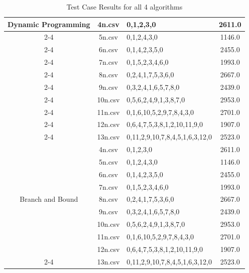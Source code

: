 \documentclass[11pt, a4paper]{article}
\begin{document}
\begin{table}[htbp]
{\begin{tabular}{|c|c|l|c|}
\multirow{9}{*}{Dynamic Programming} 
& 4n.csv & 0,1,2,3,0 & 2611.0 \\ \cline{2-4}
& 5n.csv & 0,1,2,4,3,0 & 1146.0 \\ \cline{2-4}
& 6n.csv &0,1,4,2,3,5,0 & 2455.0 \\ \cline{2-4}
& 7n.csv &0,1,5,2,3,4,6,0 & 1993.0  \\ \cline{2-4}
& 8n.csv & 0,2,4,1,7,5,3,6,0 & 2667.0 \\ \cline{2-4}
& 9n.csv & 0,3,2,4,1,6,5,7,8,0 & 2439.0 \\ \cline{2-4}
& 10n.csv &0,5,6,2,4,9,1,3,8,7,0 & 2953.0  \\ \cline{2-4}
& 11n.csv & 0,1,6,10,5,2,9,7,8,4,3,0 & 2701.0 \\ \cline{2-4}
& 12n.csv &0,6,4,7,5,3,8,1,2,10,11,9,0 & 1907.0  \\ \cline{2-4}
& 13n.csv &0,11,2,9,10,7,8,4,5,1,6,3,12,0 & 2523.0  \\ \hline
\multirow{9}{*}{Branch and Bound} 
& 4n.csv & 0,1,2,3,0 & 2611.0 \\ \cline{2-4}
& 5n.csv & 0,1,2,4,3,0 & 1146.0 \\ \cline{2-4}
& 6n.csv &0,1,4,2,3,5,0 & 2455.0 \\ \cline{2-4}
& 7n.csv & 0,1,5,2,3,4,6,0 & 1993.0  \\ \cline{2-4}
& 8n.csv & 0,2,4,1,7,5,3,6,0 & 2667.0 \\ \cline{2-4}
& 9n.csv & 0,3,2,4,1,6,5,7,8,0 & 2439.0 \\ \cline{2-4}
& 10n.csv &0,5,6,2,4,9,1,3,8,7,0 & 2953.0  \\ \cline{2-4}
& 11n.csv & 0,1,6,10,5,2,9,7,8,4,3,0 & 2701.0 \\ \cline{2-4}
& 12n.csv &0,6,4,7,5,3,8,1,2,10,11,9,0 & 1907.0  \\ \cline{2-4}
& 13n.csv &0,11,2,9,10,7,8,4,5,1,6,3,12,0 & 2523.0  \\ \hline
\end{tabular}%
}
\caption{Test Case Results for all 4 algorithms}
\label{tab:tsp_results}
\end{table}
\end{document}

